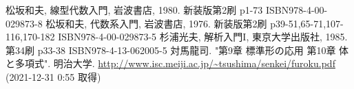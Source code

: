 \documentclass[dvipdfmx]{jsarticle}
\begin{document}
\begin{thebibliography}{50}
  松坂和夫, 線型代数入門, 岩波書店, 1980. 新装版第2刷 p1-73 ISBN978-4-00-029873-8
  松坂和夫, 代数系入門, 岩波書店, 1976. 新装版第2刷 p39-51,65-71,107-116,170-182 ISBN978-4-00-029873-5
  杉浦光夫, 解析入門I, 東京大学出版社, 1985. 第34刷 p33-38 ISBN978-4-13-062005-5
  対馬龍司. "第9章 標準形の応用 第10章 体と多項式". 明治大学. \url{http://www.isc.meiji.ac.jp/~tsushima/senkei/furoku.pdf} (2021-12-31 0:55 取得)
\end{thebibliography}
\end{document}
